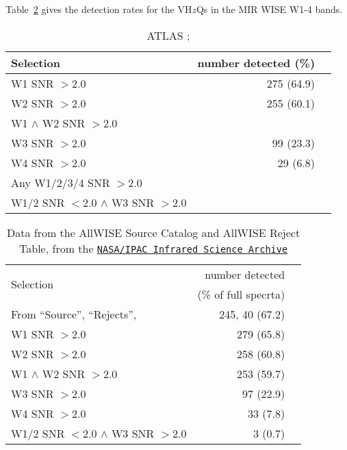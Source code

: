 \documentclass[usenatbib]{mnras}
\begin{document}
    Table~\ref{tab:mir_detection} gives the detection rates for the
    VH$z$Qs in the MIR WISE W1-4 bands. 
    \begin{table}
      \begin{tabular}{l r l}
        \hline  \hline
        Selection   & number detected (\%) \\
        \hline  
        W1 SNR $> 2.0$                                             &  275  (64.9) \\
        W2 SNR $> 2.0$                                            &   255 (60.1) \\
        W1 $\land$ W2 SNR $> 2.0$                         &  \\
        W3 SNR $> 2.0$                                            &  99    (23.3) \\
        W4 SNR $> 2.0$                                            &  29    (6.8) \\
        Any W1/2/3/4 SNR $>2.0$                           & \\
        W1/2 SNR $< 2.0$ $\land$ W3 SNR $>2.0$ & \\
        \hline  \hline
      \end{tabular}
      \caption{ATLAS \citet{Shanks2015}; }
      \label{tab:mir_detection}
    \end{table}

    \begin{table}
      \begin{tabular}{l r l}
        \hline  \hline
         \multirow{2}{*}{Selection}   & number detected \\ 
                                                   & (\% of full specrta) \\
        \hline  
        From ``Source'', ``Rejects'',                    & 245, 40  (67.2) \\
        W1 SNR $> 2.0$                                       &  279  (65.8) \\
        W2 SNR $> 2.0$                                       &  258 (60.8) \\
        W1 $\land$ W2 SNR $> 2.0$                    & 253   (59.7)  \\
        W3 SNR $> 2.0$                                     &  97    (22.9) \\
        W4 SNR $> 2.0$                                     &  33    (7.8) \\
        W1/2 SNR $< 2.0$ $\land$ W3 SNR $>2.0$ &  3 (0.7)\\
        \hline  \hline
      \end{tabular}
      \caption{Data from the AllWISE Source Catalog and AllWISE Reject Table, from the 
\href{https://irsa.ipac.caltech.edu/cgi-bin/Gator/nph-scan?submit=Select&projshort=WISE} {{\tt NASA/IPAC  Infrared Science Archive}}}
      \label{tab:mir_detection}
    \end{table}
    
\end{document}

